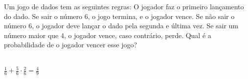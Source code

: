 \begin{ex}
Um jogo de dados tem as seguintes regras: O jogador faz o primeiro lançamento do dado.  Se sair o número 6, o jogo termina, e o jogador vence. Se não sair o número 6, o jogador deve lançar o dado pela segunda e última vez. Se sair um número maior que 4, o jogador vence, caso contrário, perde. Qual é a probabilidade de o jogador vencer esse jogo?
  \begin{sol}
   \phantom{A} \\
   $\frac{1}{6}+\frac{5}{6}\cdot\frac{2}{6}=\frac{4}{9}$
  \end{sol}
\end{ex}